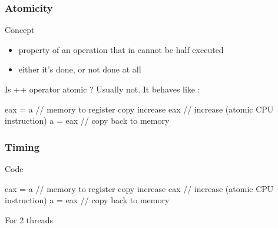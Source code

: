 \begin{frame}[fragile]
  \frametitle{Atomicity}
  \begin{block}{Concept}
    \begin{itemize}
    \item property of an operation that in cannot be half executed
    \item either it's done, or not done at all
    \end{itemize}
  \end{block}
  \pause
  \begin{exampleblock}{Is ++ operator atomic ?}
    Usually not. It behaves like :
    \begin{cppcode*}{}
      eax = a       // memory to register copy
      increase eax  // increase (atomic CPU instruction)
      a = eax       // copy back to memory
    \end{cppcode*}
  \end{exampleblock}
\end{frame}

\begin{frame}[fragile]
  \frametitle{Timing}
  \begin{exampleblock}{Code}
    \begin{cppcode*}{}
      eax = a       // memory to register copy
      increase eax  // increase (atomic CPU instruction)
      a = eax       // copy back to memory
    \end{cppcode*}
  \end{exampleblock}
  \begin{block}{For 2 threads}
  \end{block}
\end{frame}

